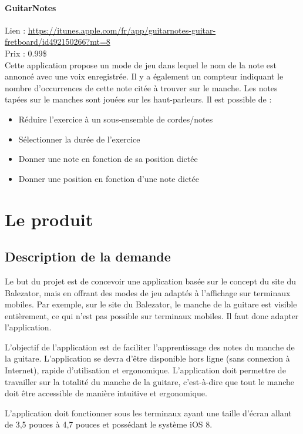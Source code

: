 \documentclass{scrreprt}
\begin{document}
\subsubsection{GuitarNotes}
Lien :  \url{https://itunes.apple.com/fr/app/guitarnotes-guitar-fretboard/id492150266?mt=8}\\
Prix : 0.99\$\\
Cette application propose un mode de jeu dans lequel le nom de la note est annoncé avec une voix enregistrée. Il y a également un compteur indiquant le nombre d'occurrences de cette note citée à trouver sur le manche. Les notes tapées sur le manches sont jouées sur les haut-parleurs.
Il est possible de :
\begin{itemize}
\item Réduire l’exercice à un sous-ensemble de cordes/notes
\item Sélectionner la durée de l’exercice
\item Donner une note en fonction de sa position dictée
\item Donner une position en fonction d’une note dictée
\end{itemize}


\chapter{Le produit}
\section{Description de la demande}

Le but du projet est de concevoir une application basée sur le concept du site du Balezator, mais en offrant des modes de jeu adaptés à l’affichage sur terminaux mobiles. Par exemple, sur le site du Balezator, le manche de la guitare est visible entièrement, ce qui n’est pas possible sur terminaux mobiles. Il faut donc adapter l’application.

L’objectif de l’application est de faciliter l’apprentissage des notes du manche de la guitare. L’application se devra d’être disponible hors ligne (sans connexion à Internet), rapide d’utilisation et ergonomique. L’application doit permettre de travailler sur la totalité du manche de la guitare, c’est-à-dire que tout le manche doit être accessible de manière intuitive et ergonomique.

L’application doit fonctionner sous les terminaux ayant une taille d’écran allant de 3,5 pouces à 4,7 pouces et possédant le système iOS 8.
\end{document}
